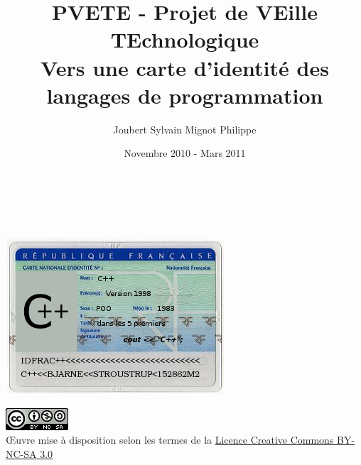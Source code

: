 \documentclass[a4paper, 11pt]{article}
\title{PVETE - Projet de VEille TEchnologique \\
Vers une carte d'identité des langages de programmation}
\author{{\sc Joubert} Sylvain \hspace{1cm} {\sc Mignot} Philippe}
\date{Novembre 2010 - Mars 2011}
\begin{document}

\begin{titlepage}
\begin{center}
\LARGE \thetitle \normalsize \\
\bigskip \bigskip \bigskip
\large \theauthor \\
\bigskip \bigskip
\thedate \normalsize
\end{center}

\vspace*{\fill}

\begin{center}
\includegraphics[scale=1.2]{img/carte.png}
\end{center}

\vspace*{\fill}
\vspace*{\fill}

\includegraphics[scale=1]{img/cc}\\
Œuvre mise à disposition selon les termes de la \href{http://creativecommons.org/licenses/by-nc-sa/3.0/}{Licence Creative Commons BY-NC-SA 3.0}
\end{titlepage}

\tableofcontents
\newpage








\end{document}
